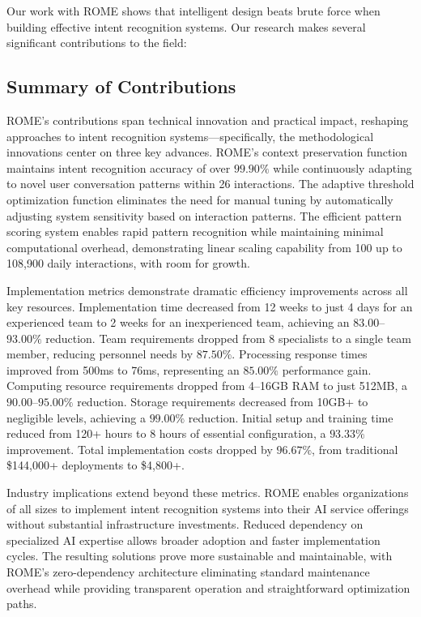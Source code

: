 \documentclass[12pt]{article}
\begin{document}
Our work with ROME shows that intelligent design beats brute force when building effective intent recognition systems. Our research makes several significant contributions to the field:

\subsection{Summary of Contributions}
ROME's contributions span technical innovation and practical impact, reshaping approaches to intent recognition systems---specifically, the methodological innovations center on three key advances. ROME's context preservation function maintains intent recognition accuracy of over $99.90\%$ while continuously adapting to novel user conversation patterns within 26 interactions. The adaptive threshold optimization function eliminates the need for manual tuning by automatically adjusting system sensitivity based on interaction patterns. The efficient pattern scoring system enables rapid pattern recognition while maintaining minimal computational overhead, demonstrating linear scaling capability from 100 up to 108,900 daily interactions, with room for growth.

Implementation metrics demonstrate dramatic efficiency improvements across all key resources. Implementation time decreased from 12 weeks to just 4 days for an experienced team to 2 weeks for an inexperienced team, achieving an $83.00$--$93.00\%$ reduction. Team requirements dropped from 8 specialists to a single team member, reducing personnel needs by $87.50\%$. Processing response times improved from 500ms to 76ms, representing an $85.00\%$ performance gain. Computing resource requirements dropped from 4--16GB RAM to just 512MB, a $90.00$--$95.00\%$ reduction. Storage requirements decreased from 10GB+ to negligible levels, achieving a $99.00\%$ reduction. Initial setup and training time reduced from 120+ hours to 8 hours of essential configuration, a $93.33\%$ improvement. Total implementation costs dropped by $96.67\%$, from traditional \$144,000+ deployments to \$4,800+.

Industry implications extend beyond these metrics. ROME enables organizations of all sizes to implement intent recognition systems into their AI service offerings without substantial infrastructure investments. Reduced dependency on specialized AI expertise allows broader adoption and faster implementation cycles. The resulting solutions prove more sustainable and maintainable, with ROME's zero-dependency architecture eliminating standard maintenance overhead while providing transparent operation and straightforward optimization paths.
\end{document}
